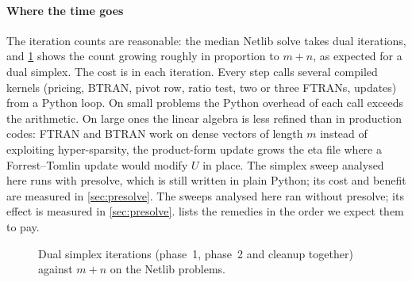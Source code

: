 \paragraph{Where the time goes}
The iteration counts are reasonable: the median Netlib solve takes \medItSpx{} dual iterations, and
\cref{fig:iters} shows the count growing roughly in proportion to $m+n$, as expected for a dual simplex.
The cost is in each iteration. Every step calls several compiled kernels (pricing, BTRAN, pivot row,
ratio test, two or three FTRANs, updates) from a Python loop. On small problems the Python overhead
of each call exceeds the arithmetic. On large ones the linear algebra is less refined than in
production codes: FTRAN and BTRAN work on dense vectors of length $m$ instead of exploiting
hyper-sparsity, the product-form update grows the eta file where a Forrest--Tomlin update would
modify $U$ in place. \ifnum{} The simplex sweep analysed here runs with presolve,
which is still written in plain Python; its cost and benefit are measured in \cref{sec:presolve}.\else
The sweeps analysed here ran without presolve; its effect is measured in \cref{sec:presolve}.\fi{}  lists the remedies in the order we expect them to pay.

\begin{figure}[tbp]
\centering
{}
\caption[Dual simplex iterations against problem size]{Dual simplex iterations (phase~1, phase~2
and cleanup together) against $m+n$ on the Netlib problems.}
\label{fig:iters}
\end{figure}

